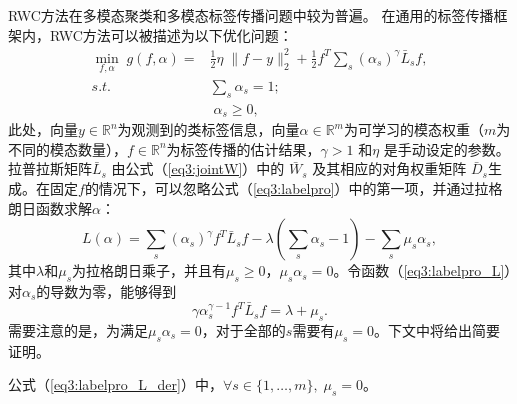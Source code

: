 RWC方法在多模态聚类和多模态标签传播问题中较为普遍\cite{wang2009unified,xu2016discriminatively,xu2014multi}。 在通用的标签传播框架内，RWC方法可以被描述为以下优化问题：
\begin{equation}
\begin{split}
\mathop{\mathrm{min}}_{{f},{\alpha}}\;g({f},{\alpha})=&\frac{1}{2}\eta\; \|{f}-{y}\|^2_2+\frac{1}{2}{f}^T \sum_s(\alpha_s)^\gamma{\bar{{L}}}_s{f}, \\
s.t. \quad&\sum_s \alpha_s = 1;\\
&\;\alpha_s \ge 0,
\end{split}
\label{eq3:labelpro}
\end{equation}
此处，向量$ {y} \in  \mathbb{R}^{n} $为观测到的类标签信息，向量$ {\alpha} \in  \mathbb{R}^m$为可学习的模态权重（$m$为不同的模态数量），$ {f} \in  \mathbb{R}^{n}$为标签传播的估计结果，$ \gamma > 1$ 和$ \eta $ 是手动设定的参数。拉普拉斯矩阵$ \bar{{L}}_s $ 由公式（\ref{eq3:jointW}）中的 $ \bar{{W}}_s $  及其相应的对角权重矩阵 $ \bar{{D}}_s $生成。在固定$f$的情况下，可以忽略公式（\ref{eq3:labelpro}）中的第一项，并通过拉格朗日函数求解$ {\alpha} $：
\begin{equation}
L({\alpha})=\sum_s(\alpha_s)^\gamma{f}^T {\bar{{L}}}_s{f} - \lambda ( \sum_s \alpha_s - 1)-\sum_s \mu_s \alpha_s,
\label{eq3:labelpro_L}
\end{equation}
其中$\lambda$和$\mu_s$为拉格朗日乘子，并且有$ \mu_s \ge 0$，$ \mu_s\alpha_s=0$。令函数（\ref{eq3:labelpro_L}）对$ \alpha_s $的导数为零，能够得到
\begin{equation}
\gamma \alpha_s^{\gamma-1}{f}^T {\bar{{L}}}_s{f} =\lambda + \mu_s.
\label{eq3:labelpro_L_der}
\end{equation}
需要注意的是，为满足$ \mu_s\alpha_s=0 $，对于全部的$s$需要有$\mu_s=0 $。下文中将给出简要证明。

\begin{proposition}
   \label{thm3} 
    公式（\ref{eq3:labelpro_L_der}）中，$\forall s \in \{1,\dots,m\}, \; \mu_s=0$。
\end{proposition}

